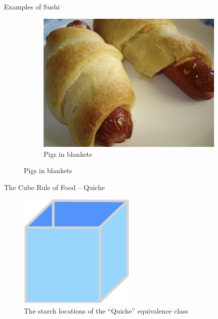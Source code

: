 \documentclass{beamer}
\begin{document}
\begin{frame}{Examples of Sushi}
\begin{figure}
        \begin{subfigure}{.4\textwidth}
          \centering
          \includegraphics[width=.8\linewidth]{sushi/22_pigs.jpg}
          \caption{\label{fig:pigs-in-blankets}Pigs in blankets}
        \end{subfigure}
    \end{figure}
\end{frame}

\begin{frame}{The Cube Rule of Food -- Quiche}
    \begin{figure}
        \includegraphics[width=0.5\textwidth]{quiche/23_quiche.jpg}
        \caption{\label{fig:quiche-diagram}The starch locations of the ``Quiche'' equivalence class}
    \end{figure}
\end{frame}
\end{document}
